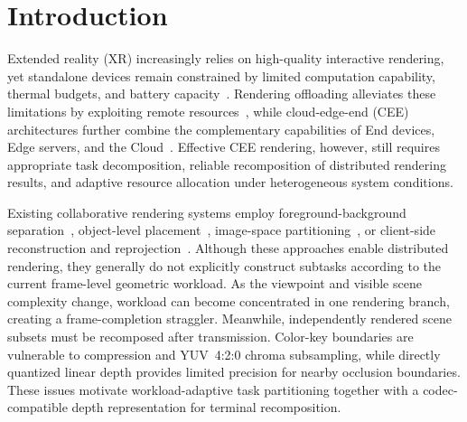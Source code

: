 \documentclass[acmsmall]{acmart}
\begin{document}

	
	
	\maketitle
	\pagestyle{plain}
	\thispagestyle{plain}
	
\section{Introduction}
	
	Extended reality (XR) increasingly relies on high-quality interactive rendering, yet standalone devices remain constrained by limited computation capability, thermal budgets, and battery capacity~\cite{lai_furion_2020,chen_you_2025}. Rendering offloading alleviates these limitations by exploiting remote resources~\cite{zhao_virtual_2021,huang_virtual_2023}, while cloud-edge-end (CEE) architectures further combine the complementary capabilities of End devices, Edge servers, and the Cloud~\cite{su_crossport_2026,li_toward_2024}. Effective CEE rendering, however, still requires appropriate task decomposition, reliable recomposition of distributed rendering results, and adaptive resource allocation under heterogeneous system conditions.
	
	Existing collaborative rendering systems employ foreground-background separation~\cite{lai_furion_2020,meng_coterie_2020}, object-level placement~\cite{lu_renderfusion_2023}, image-space partitioning~\cite{corbillon_viewport-adaptive_2017,cantory_image-space_2023}, or client-side reconstruction and reprojection~\cite{ke_collabvr_2023,gao_xrgo_2025}. Although these approaches enable distributed rendering, they generally do not explicitly construct subtasks according to the current frame-level geometric workload. As the viewpoint and visible scene complexity change, workload can become concentrated in one rendering branch, creating a frame-completion straggler. Meanwhile, independently rendered scene subsets must be recomposed after transmission. Color-key boundaries are vulnerable to compression and YUV~4:2:0 chroma subsampling, while directly quantized linear depth provides limited precision for nearby occlusion boundaries. These issues motivate workload-adaptive task partitioning together with a codec-compatible depth representation for terminal recomposition.
	
\end{document}
